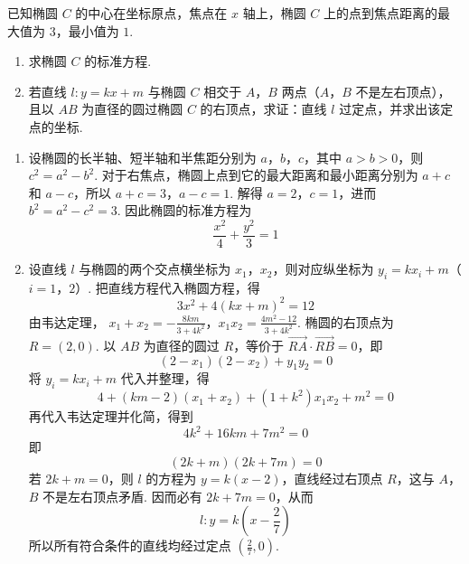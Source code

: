 \begin{problem}
已知椭圆 \(C\) 的中心在坐标原点，焦点在 \(x\) 轴上，椭圆 \(C\) 上的点到焦点距离的最大值为 \(3\)，最小值为 \(1\).

\begin{enumerate}
\item 求椭圆 \(C\) 的标准方程.
\item 若直线 \(l: y = kx + m\) 与椭圆 \(C\) 相交于 \(A\)，\(B\) 两点（\(A\)，\(B\) 不是左右顶点），且以 \(AB\) 为直径的圆过椭圆 \(C\) 的右顶点，求证：直线 \(l\) 过定点，并求出该定点的坐标.
\end{enumerate}
\end{problem}

\begin{solution}
\begin{enumerate}
\item 设椭圆的长半轴、短半轴和半焦距分别为 \(a\)，\(b\)，\(c\)，其中 \(a>b>0\)，则 \(c^{2}=a^{2}-b^{2}\). 对于右焦点，椭圆上点到它的最大距离和最小距离分别为 \(a+c\) 和 \(a-c\)，所以
\(a+c=3\)，\(a-c=1\).
解得 \(a=2\)，\(c=1\)，进而 \(b^{2}=a^{2}-c^{2}=3\). 因此椭圆的标准方程为
\[
\frac{x^{2}}{4}+\frac{y^{2}}{3}=1
\]
\item 设直线 \(l\) 与椭圆的两个交点横坐标为 \(x_{1}\)，\(x_{2}\)，则对应纵坐标为 \(y_{i}=kx_{i}+m\)（\(i=1\)，\(2\)）. 把直线方程代入椭圆方程，得
\[
3x^{2}+4(kx+m)^{2}=12
\]
由韦达定理，
\(x_{1}+x_{2}=-\frac{8km}{3+4k^{2}}\)，\(x_{1}x_{2}=\frac{4m^{2}-12}{3+4k^{2}}\).
椭圆的右顶点为 \(R=(2,0)\). 以 \(AB\) 为直径的圆过 \(R\)，等价于 \(\overrightarrow{RA}\cdot\overrightarrow{RB}=0\)，即
\[
(2-x_{1})(2-x_{2})+y_{1}y_{2}=0
\]
将 \(y_{i}=kx_{i}+m\) 代入并整理，得
\[
4+(km-2)(x_{1}+x_{2})+(1+k^{2})x_{1}x_{2}+m^{2}=0
\]
再代入韦达定理并化简，得到
\[
4k^{2}+16km+7m^{2}=0
\]
即
\[
(2k+m)(2k+7m)=0
\]
若 \(2k+m=0\)，则 \(l\) 的方程为 \(y=k(x-2)\)，直线经过右顶点 \(R\)，这与 \(A\)，\(B\) 不是左右顶点矛盾. 因而必有 \(2k+7m=0\)，从而
\[
l:y=k\left(x-\frac{2}{7}\right)
\]
所以所有符合条件的直线均经过定点 \(\left(\frac{2}{7},0\right)\).
\end{enumerate}
\end{solution}
